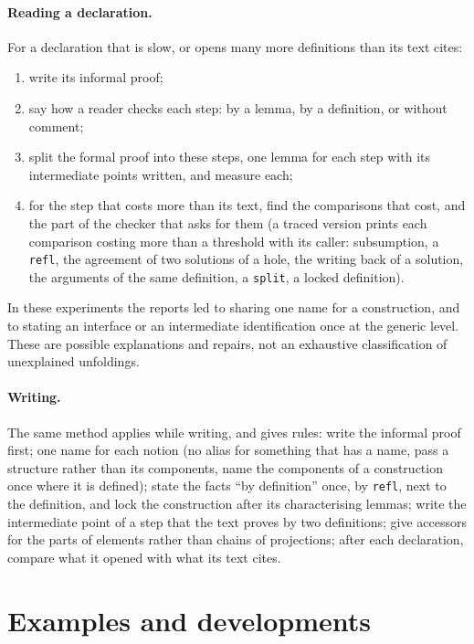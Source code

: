 \documentclass[11pt]{article}
\newcommand{\kw}[1]{\texttt{#1}}
\begin{document}
\paragraph{Reading a declaration.} For a declaration that is slow, or
opens many more definitions than its text cites:
\begin{enumerate}
\item write its informal proof;
\item say how a reader checks each step: by a lemma, by a definition, or
  without comment;
\item split the formal proof into these steps, one lemma for each step
  with its intermediate points written, and measure each;
\item for the step that costs more than its text, find the comparisons
  that cost, and the part of the checker that asks for them (a traced
  version prints each comparison costing more than a threshold with its
  caller: subsumption, a \kw{refl}, the agreement of two solutions of a
  hole, the writing back of a solution, the arguments of the same
  definition, a \kw{split}, a locked definition).
\end{enumerate}
In these experiments the reports led to sharing one name for a construction, and to stating an interface or an
intermediate identification once at the generic level. These are
possible explanations and repairs, not an exhaustive classification of
unexplained unfoldings.

\paragraph{Writing.} The same method applies while writing, and gives
rules: write the informal proof first; one name for each notion (no
alias for something that has a name, pass a structure rather than its
components, name the components of a construction once where it is
defined); state the facts ``by definition'' once, by \kw{refl}, next to
the definition, and lock the construction after its characterising
lemmas; write the intermediate point of a step that the text proves by
two definitions; give accessors for the parts of elements rather than
chains of projections; after each declaration, compare what it opened
with what its text cites.

\section{Examples and developments}\label{sec:results}
\end{document}
